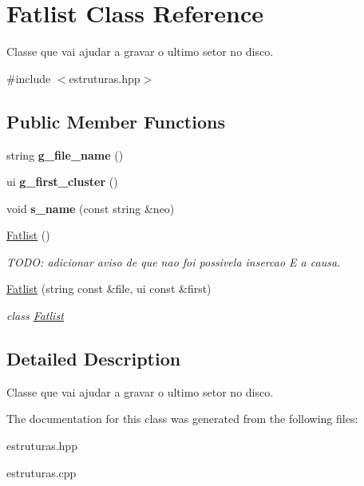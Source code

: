 \hypertarget{classFatlist}{}\section{Fatlist Class Reference}
\label{classFatlist}


Classe que vai ajudar a gravar o ultimo setor no disco.  




{\ttfamily \#include $<$estruturas.\+hpp$>$}

\subsection*{Public Member Functions}
\begin{DoxyCompactItemize}
\item 
string {\bfseries g\+\_\+file\+\_\+name} ()\hypertarget{classFatlist_a11b2cb0b6c5a274425c3f4edcd8f786b}{}\label{classFatlist_a11b2cb0b6c5a274425c3f4edcd8f786b}

\item 
ui {\bfseries g\+\_\+first\+\_\+cluster} ()\hypertarget{classFatlist_a3008a5e331fce76e498c836db215593e}{}\label{classFatlist_a3008a5e331fce76e498c836db215593e}

\item 
void {\bfseries s\+\_\+name} (const string \&neo)\hypertarget{classFatlist_adfd75053a67134d8021fdac05c50008f}{}\label{classFatlist_adfd75053a67134d8021fdac05c50008f}

\item 
\hyperlink{classFatlist_ad48b9bd0cbb1867382d8e8084003f219}{Fatlist} ()\hypertarget{classFatlist_ad48b9bd0cbb1867382d8e8084003f219}{}\label{classFatlist_ad48b9bd0cbb1867382d8e8084003f219}

\begin{DoxyCompactList}\small\item\em T\+O\+DO\+: adicionar aviso de que nao foi possivela insercao E a causa. \end{DoxyCompactList}\item 
\hyperlink{classFatlist_a995b5e82c6ca0b7626173677a820e025}{Fatlist} (string const \&file, ui const \&first)\hypertarget{classFatlist_a995b5e82c6ca0b7626173677a820e025}{}\label{classFatlist_a995b5e82c6ca0b7626173677a820e025}

\begin{DoxyCompactList}\small\item\em class \hyperlink{classFatlist}{Fatlist} \end{DoxyCompactList}\end{DoxyCompactItemize}


\subsection{Detailed Description}
Classe que vai ajudar a gravar o ultimo setor no disco. 

The documentation for this class was generated from the following files\+:\begin{DoxyCompactItemize}
\item 
estruturas.\+hpp\item 
estruturas.\+cpp\end{DoxyCompactItemize}
